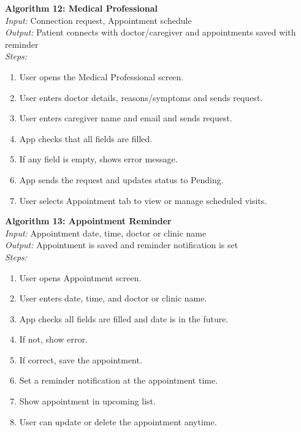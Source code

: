 \documentclass[12pt, a4paper, oneside]{report}
\begin{document}
\textbf{Algorithm 12: Medical Professional}\\
\textit{Input:} Connection request, Appointment schedule\\
\textit{Output:} Patient connects with doctor/caregiver and appointments saved with reminder\\
\textit{Steps:}
\begin{enumerate}
    \item User opens the Medical Professional screen.
    \item User enters doctor details, reasons/symptoms and sends request.
    \item User enters caregiver name and email and sends request.
    \item App checks that all fields are filled.
    \item If any field is empty, shows error message.
    \item App sends the request and updates status to Pending.
    \item User selects Appointment tab to view or manage scheduled visits.
\end{enumerate}

\textbf{Algorithm 13: Appointment Reminder}\\
\textit{Input:} Appointment date, time, doctor or clinic name\\
\textit{Output:} Appointment is saved and reminder notification is set\\
\textit{Steps:}
\begin{enumerate}
    \item User opens Appointment screen.
    \item User enters date, time, and doctor or clinic name.
    \item App checks all fields are filled and date is in the future.
    \item If not, show error.
    \item If correct, save the appointment.
    \item Set a reminder notification at the appointment time.
    \item Show appointment in upcoming list.
    \item User can update or delete the appointment anytime.
\end{enumerate}
\end{document}
